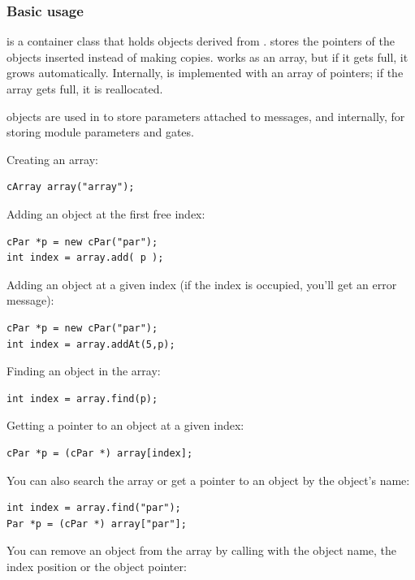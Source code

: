 \subsubsection{Basic usage}


 is a container class that holds objects derived from
.  stores the pointers of the objects
inserted instead of making copies.  works as an array,
but if it gets full, it grows automatically. Internally,
 is implemented with an array of pointers; if the array
gets full, it is reallocated.

 objects are used in {\opp} to store parameters
attached to messages, and internally, for storing module parameters
and gates.


Creating an array:

\begin{verbatim}
cArray array("array");
\end{verbatim}

Adding an object at the first free index:

\begin{verbatim}
cPar *p = new cPar("par");
int index = array.add( p );
\end{verbatim}


Adding an object at a given index (if the index is occupied,
you'll get an error message):

\begin{verbatim}
cPar *p = new cPar("par");
int index = array.addAt(5,p);
\end{verbatim}


Finding an object in the array:

\begin{verbatim}
int index = array.find(p);
\end{verbatim}

Getting a pointer to an object at a given index:

\begin{verbatim}
cPar *p = (cPar *) array[index];
\end{verbatim}

You can also search the array or get a pointer to an object by
the object's name:

\begin{verbatim}
int index = array.find("par");
Par *p = (cPar *) array["par"];
\end{verbatim}


You can remove an object from the array by calling 
with the object name, the index position or the object pointer:

